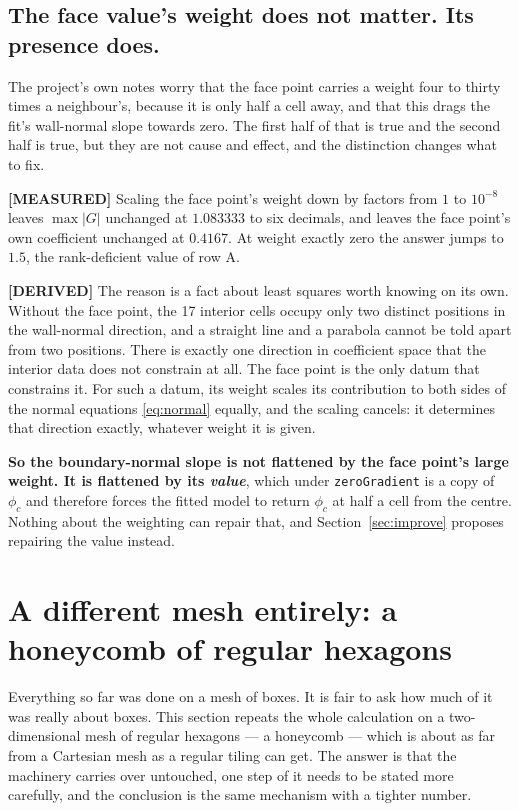 \documentclass[11pt,a4paper]{article}
\newcommand{\derived}{\textcolor{blue!50!black}{\textbf{[DERIVED]}}}
\newcommand{\measured}{\textcolor{green!35!black}{\textbf{[MEASURED]}}}
\begin{document}
\subsection{The face value's weight does not matter. Its presence does.}
\label{sec:weightfree}

The project's own notes worry that the face point carries a weight four to thirty times a
neighbour's, because it is only half a cell away, and that this drags the fit's wall-normal
slope towards zero. The first half of that is true and the second half is true, but they are
not cause and effect, and the distinction changes what to fix.

\measured{} Scaling the face point's weight down by factors from $1$ to $10^{-8}$ leaves
$\max|G|$ unchanged at $1.083333$ to six decimals, and leaves the face point's own
coefficient unchanged at $0.4167$. At weight exactly zero the answer jumps to $1.5$, the
rank-deficient value of row A.

\derived{} The reason is a fact about least squares worth knowing on its own. Without the
face point, the 17 interior cells occupy only two distinct positions in the wall-normal
direction, and a straight line and a parabola cannot be told apart from two positions. There
is exactly one direction in coefficient space that the interior data does not constrain at
all. The face point is the only datum that constrains it. For such a datum, its weight scales
its contribution to both sides of the normal equations \eqref{eq:normal} equally, and the
scaling cancels: it determines that direction exactly, whatever weight it is given.

\textbf{So the boundary-normal slope is not flattened by the face point's large weight. It is
flattened by its \emph{value}}, which under \texttt{zeroGradient} is a copy of $\phi_c$ and
therefore forces the fitted model to return $\phi_c$ at half a cell from the centre. Nothing
about the weighting can repair that, and Section~\ref{sec:improve} proposes repairing the
value instead.

\section{A different mesh entirely: a honeycomb of regular hexagons}
\label{sec:hexagon}

Everything so far was done on a mesh of boxes. It is fair to ask how much of it was really
about boxes. This section repeats the whole calculation on a two-dimensional mesh of regular
hexagons --- a honeycomb --- which is about as far from a Cartesian mesh as a regular tiling
can get. The answer is that the machinery carries over untouched, one step of it needs to be
stated more carefully, and the conclusion is the same mechanism with a tighter number.
\end{document}
